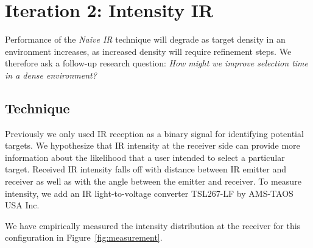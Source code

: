 
\section{Iteration 2: Intensity IR}


Performance of the {\em Naive IR} technique will degrade as target density in an environment increases, as increased density will require refinement steps. We therefore ask a follow-up research question: {\em How might we improve selection time in a dense environment?}

\subsection{Technique}
Previously we only used IR reception as a binary signal for identifying potential targets. We hypothesize that IR intensity at the receiver side can provide more information about the likelihood that a user intended to select a particular target. Received IR intensity falls off with distance between IR emitter and receiver as well as with the angle between the emitter and receiver. To measure intensity, we add an IR light-to-voltage converter TSL267-LF by AMS-TAOS USA Inc.


We have empirically measured the intensity distribution at the receiver for this configuration in Figure~\ref{fig:measurement}. 

